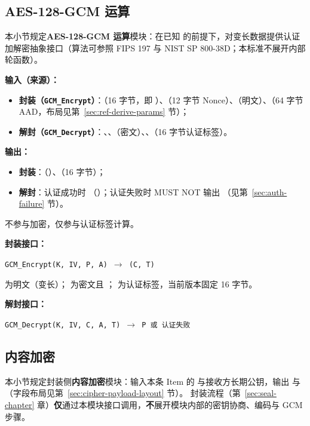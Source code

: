 \subsection{AES-128-GCM 运算}\label{sec:aes-gcm}
本小节规定\textbf{AES-128-GCM 运算}模块：在已知  的前提下，对变长数据提供认证加解密抽象接口（算法可参照 FIPS 197 与 NIST SP 800-38D；本标准不展开内部轮函数）。

\textbf{输入（来源）：}
\begin{itemize}
  \item \textbf{封装（\texttt{GCM\_Encrypt}）}：（16 字节，即 ）、（12 字节 Nonce）、（明文）、（64 字节 AAD，布局见第~\ref{sec:ref-derive-params} 节）；
  \item \textbf{解封（\texttt{GCM\_Decrypt}）}：、、（密文）、、（16 字节认证标签）。
\end{itemize}

\textbf{输出：}
\begin{itemize}
  \item \textbf{封装}：（）、（16 字节）；
  \item \textbf{解封}：认证成功时 （）；认证失败时 MUST NOT 输出 （见第~\ref{sec:auth-failure} 节）。
\end{itemize}

 不参与加密，仅参与认证标签计算。

\textbf{封装接口：}
\begin{center}
  \texttt{GCM\_Encrypt(K, IV, P, A) $\rightarrow$ (C, T)}
\end{center}
 为明文（变长）； 为密文且 ； 为认证标签，当前版本固定 16 字节。

\textbf{解封接口：}
\begin{center}
  \texttt{GCM\_Decrypt(K, IV, C, A, T) $\rightarrow$ P \quad 或 \quad 认证失败}
\end{center}

\subsection{内容加密}\label{sec:content-encryption}
本小节规定封装侧\textbf{内容加密}模块：输入本条 Item 的  与接收方长期公钥，输出  与 （字段布局见第~\ref{sec:cipher-payload-layout} 节）。
封装流程（第~\ref{sec:seal-chapter} 章）\textbf{仅}通过本模块接口调用，\textbf{不}展开模块内部的密钥协商、编码与 GCM 步骤。

